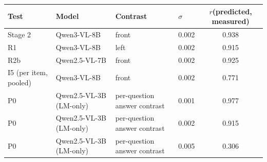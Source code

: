 \begin{tabular}{llllc}
\toprule
Test & Model & Contrast & $\sigma$ & $r$(predicted, measured) \\
\midrule
Stage 2 & Qwen3-VL-8B & front & 0.002 & 0.938 \\
R1 & Qwen3-VL-8B & left & 0.002 & 0.915 \\
R2b & Qwen2.5-VL-7B & front & 0.002 & 0.925 \\
I5 (per item, pooled) & Qwen3-VL-8B & front & 0.002 & 0.771 \\
P0 & Qwen2.5-VL-3B (LM-only) & per-question answer contrast & 0.001 & 0.977 \\
P0 & Qwen2.5-VL-3B (LM-only) & per-question answer contrast & 0.002 & 0.915 \\
P0 & Qwen2.5-VL-3B (LM-only) & per-question answer contrast & 0.005 & 0.306 \\
\bottomrule
\end{tabular}
